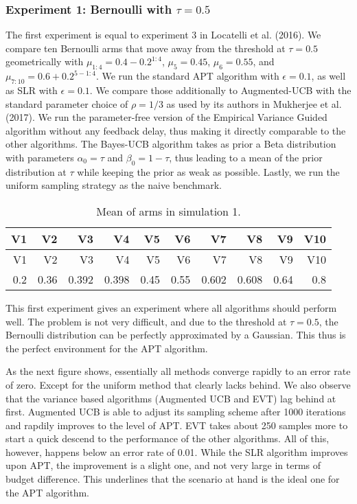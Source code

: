 \documentclass[12pt,]{article}
\begin{document}
\subsubsection{\texorpdfstring{Experiment 1: Bernoulli with
\(\tau = 0.5\)}{Experiment 1: Bernoulli with \textbackslash{}tau = 0.5}}\label{experiment-1-bernoulli-with-tau-0.5}

The first experiment is equal to experiment 3 in Locatelli et al.
(2016). We compare ten Bernoulli arms that move away from the threshold
at \(\tau = 0.5\) geometrically with \(\mu_{1:4} = 0.4-0.2^{1:4}\),
\(\mu_5 = 0.45\), \(\mu_6 = 0.55\), and
\(\mu_{7:10} = 0.6 + 0.2^{5-1:4}\). We run the standard APT algorithm
with \(\epsilon = 0.1\), as well as SLR with \(\epsilon = 0.1\). We
compare those additionally to Augmented-UCB with the standard parameter
choice of \(\rho = 1/3\) as used by its authors in Mukherjee et al.
(2017). We run the parameter-free version of the Empirical Variance
Guided algorithm without any feedback delay, thus making it directly
comparable to the other algorithms. The Bayes-UCB algorithm takes as
prior a Beta distribution with parameters \(\alpha_0 = \tau\) and
\(\beta_0 = 1 - \tau\), thus leading to a mean of the prior distribution
at \(\tau\) while keeping the prior as weak as possible. Lastly, we run
the uniform sampling strategy as the naive benchmark.

\begin{longtable}[]{@{}rrrrrrrrrr@{}}
\caption{Mean of arms in simulation 1.}\tabularnewline
\toprule
V1 & V2 & V3 & V4 & V5 & V6 & V7 & V8 & V9 & V10\tabularnewline
\midrule
\endfirsthead
\toprule
V1 & V2 & V3 & V4 & V5 & V6 & V7 & V8 & V9 & V10\tabularnewline
\midrule
\endhead
0.2 & 0.36 & 0.392 & 0.398 & 0.45 & 0.55 & 0.602 & 0.608 & 0.64 &
0.8\tabularnewline
\bottomrule
\end{longtable}

This first experiment gives an experiment where all algorithms should
perform well. The problem is not very difficult, and due to the
threshold at \(\tau = 0.5\), the Bernoulli distribution can be perfectly
approximated by a Gaussian. This thus is the perfect environment for the
APT algorithm.

As the next figure shows, essentially all methods converge rapidly to an
error rate of zero. Except for the uniform method that clearly lacks
behind. We also observe that the variance based algorithms (Augmented
UCB and EVT) lag behind at first. Augmented UCB is able to adjust its
sampling scheme after 1000 iterations and rapdily improves to the level
of APT. EVT takes about 250 samples more to start a quick descend to the
performance of the other algorithms. All of this, however, happens below
an error rate of 0.01. While the SLR algorithm improves upon APT, the
improvement is a slight one, and not very large in terms of budget
difference. This underlines that the scenario at hand is the ideal one
for the APT algorithm.
\end{document}
